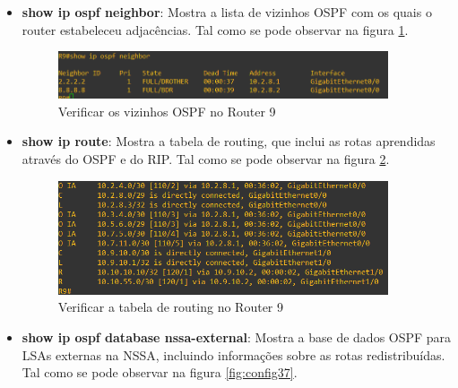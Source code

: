 \documentclass[11pt,english, openright, oneside]{book}
\begin{document}
\begin{itemize}
  \item \textbf{show ip ospf neighbor}: Mostra a lista de vizinhos OSPF com os quais o router estabeleceu adjacências. Tal como se pode observar na figura \ref{fig:config35}.
  \vspace{0.2cm}

  \begin{figure}[H]
    \centering
    \includegraphics[width=0.92\textwidth]{imagens/Tarefa4/22.ospf_neigh_R9.png}
    \caption{Verificar os vizinhos OSPF no Router 9}
    \label{fig:config35}
  \end{figure}
  \vspace{0.2cm}

  \item \textbf{show ip route}: Mostra a tabela de routing, que inclui as rotas aprendidas através do OSPF e do RIP. Tal como se pode observar na figura \ref{fig:config36}.
  \vspace{0.2cm}

  \begin{figure}[H]
    \centering
    \includegraphics[width=0.92\textwidth]{imagens/Tarefa4/22.route_R9.png}
    \caption{Verificar a tabela de routing no Router 9}
    \label{fig:config36}
  \end{figure}
  \vspace{0.2cm}

  \item \textbf{show ip ospf database nssa-external}: Mostra a base de dados OSPF para LSAs externas na NSSA, incluindo informações sobre as rotas redistribuídas. Tal como se pode observar na figura \ref{fig:config37}.
  \vspace{0.2cm}


\end{itemize}
\end{document}
